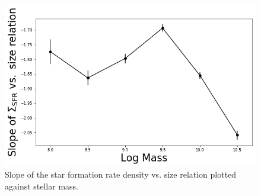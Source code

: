 \documentclass[iop]{emulateapj}
\begin{document}
\begin{figure}
	\centering
	\includegraphics[width= \columnwidth]{slope_sfrdens_size.png}
	\caption{Slope of the star formation rate density vs. size relation plotted against stellar mass.}
	\label{fig:HA_dens_mass}
	
\end{figure}


	

	
\end{document}
